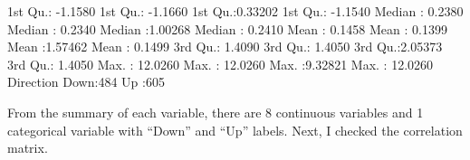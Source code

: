 \documentclass[
]{article}
\newenvironment{Shaded}{\begin{snugshade}}{\end{snugshade}}
\newcommand{\DecValTok}[1]{\textcolor[rgb]{0.00,0.00,0.81}{#1}}
\newcommand{\FloatTok}[1]{\textcolor[rgb]{0.00,0.00,0.81}{#1}}
\newcommand{\NormalTok}[1]{#1}
\newcommand{\SpecialCharTok}[1]{\textcolor[rgb]{0.00,0.00,0.00}{#1}}
\begin{document}
\begin{Shaded}
\begin{Highlighting}[]
\NormalTok{ 1st Qu.}\SpecialCharTok{:} \SpecialCharTok{{-}}\FloatTok{1.1580}\NormalTok{   1st Qu.}\SpecialCharTok{:} \SpecialCharTok{{-}}\FloatTok{1.1660}\NormalTok{   1st Qu.}\SpecialCharTok{:}\FloatTok{0.33202}\NormalTok{   1st Qu.}\SpecialCharTok{:} \SpecialCharTok{{-}}\FloatTok{1.1540}  
\NormalTok{ Median }\SpecialCharTok{:}  \FloatTok{0.2380}\NormalTok{   Median }\SpecialCharTok{:}  \FloatTok{0.2340}\NormalTok{   Median }\SpecialCharTok{:}\FloatTok{1.00268}\NormalTok{   Median }\SpecialCharTok{:}  \FloatTok{0.2410}  
\NormalTok{ Mean   }\SpecialCharTok{:}  \FloatTok{0.1458}\NormalTok{   Mean   }\SpecialCharTok{:}  \FloatTok{0.1399}\NormalTok{   Mean   }\SpecialCharTok{:}\FloatTok{1.57462}\NormalTok{   Mean   }\SpecialCharTok{:}  \FloatTok{0.1499}  
\NormalTok{ 3rd Qu.}\SpecialCharTok{:}  \FloatTok{1.4090}\NormalTok{   3rd Qu.}\SpecialCharTok{:}  \FloatTok{1.4050}\NormalTok{   3rd Qu.}\SpecialCharTok{:}\FloatTok{2.05373}\NormalTok{   3rd Qu.}\SpecialCharTok{:}  \FloatTok{1.4050}  
\NormalTok{ Max.   }\SpecialCharTok{:} \FloatTok{12.0260}\NormalTok{   Max.   }\SpecialCharTok{:} \FloatTok{12.0260}\NormalTok{   Max.   }\SpecialCharTok{:}\FloatTok{9.32821}\NormalTok{   Max.   }\SpecialCharTok{:} \FloatTok{12.0260}  
\NormalTok{ Direction }
\NormalTok{ Down}\SpecialCharTok{:}\DecValTok{484}  
\NormalTok{ Up  }\SpecialCharTok{:}\DecValTok{605}  
           
           
           
           
\end{Highlighting}
\end{Shaded}

From the summary of each variable, there are 8 continuous variables and
1 categorical variable with ``Down'' and ``Up'' labels. Next, I checked
the correlation matrix.
\end{document}
